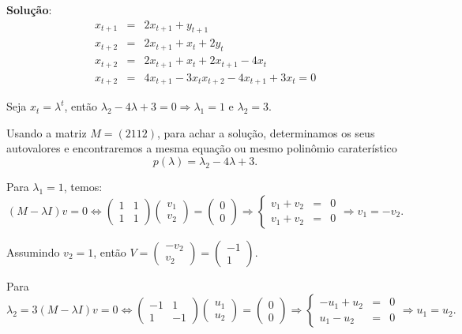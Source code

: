 \textbf{Solução}:
$$
\begin{array}{rcl}
x_{t+1} &=& 2x_{t+1} + y_{t+1} \\
x_{t+2} &=& 2x_{t+1} + x_{t} + 2y_{t} \\
x_{t+2} &=& 2x_{t+1} + x_{t} + 2x_{t+1} - 4x_{t} \\
x_{t+2} &=& 4x_{t+1} - 3x_{t} x_{t+2} - 4x_{t+1} + 3x_{t} = 0
\end{array}$$

Seja $x_{t} = \lambda^{t}$, então $\lambda_{2} - 4\lambda +3=0 \Rightarrow \lambda_{1} = 1$ e $\lambda_{2} = 3$.

Usando a matriz $M = ( 2 1 1 2 )$, para achar a solução, determinamos os seus autovalores e encontraremos a mesma equação ou mesmo polinômio caraterístico
$$p(\lambda) = \lambda_{2} -4\lambda+3.$$

Para $\lambda_{1} = 1$, temos: 
$$
(M - \lambda I) v = 0 \Leftrightarrow
\left(\begin{array}{cc} 1 & 1 \\ 1 & 1\end{array}\right)
\left(\begin{array}{c} v_1 \\ v_2 \end{array}\right)
=
\left(\begin{array}{cc} 0 \\ 0 \end{array}\right)
\Rightarrow
\left\{\begin{array}{rcl} v_1 + v_2 &=& 0 \\ v_1 + v_2 &=& 0  \end{array}\right. \Rightarrow  v_1 = -v_2.
$$

Assumindo $v_2 = 1$, então
$V =
\left(\begin{array}{r} -v_2 \\ v_2 \end{array}\right)
=
\left(\begin{array}{r} -1 \\ 1 \end{array}\right)
$.

Para $$\lambda_{2} = 3 (M - \lambda I)v = 0 \Leftrightarrow
\left(\begin{array}{cc} -1 & 1 \\ 1 & -1\end{array}\right)
\left(\begin{array}{c} u_1 \\ u_2 \end{array}\right)
=
\left(\begin{array}{c} 0 \\ 0 \end{array}\right)
\Rightarrow
\left\{\begin{array}{rcl} -u_1 + u_2 &=& 0 \\ u_1 - u_2 &=& 0  \end{array}\right. \Rightarrow  u_1 = u_2.
$$

